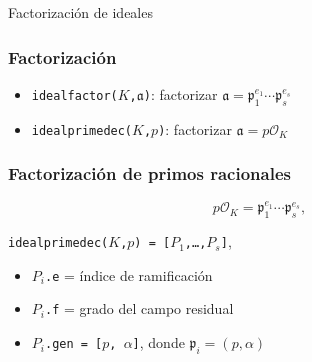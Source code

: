 \documentclass{beamer}
\renewcommand{\O}{\mathcal{O}}
\begin{document}

\begin{frame}[plain]
  \headingfont

  \begin{center}
    {\huge Factorización de ideales}
  \end{center}
\end{frame}


\begin{frame}[fragile]
  \frametitle{Factorización}

  \begin{itemize}
  \item \texttt{idealfactor($K$,$\mathfrak{a}$)}: factorizar $\mathfrak{a} = \mathfrak{p}_1^{e_1}\cdots\mathfrak{p}_s^{e_s}$

  \item \texttt{idealprimedec($K$,$p$)}: factorizar $\mathfrak{a} = p\O_K$
  \end{itemize}
\end{frame}


\begin{frame}[fragile]
  \frametitle{Factorización de primos racionales}

  $$p\O_K = \mathfrak{p}_1^{e_1} \cdots \mathfrak{p}_s^{e_s},$$

  \begin{center}
    \texttt{idealprimedec($K$,$p$) = [$P_1$,\ldots,$P_s$]},
  \end{center}

  \begin{itemize}
  \item \texttt{$P_i$.e} = índice de ramificación

  \item \texttt{$P_i$.f} = grado del campo residual

  \item \texttt{$P_i$.gen = [$p$, $\alpha$]}, donde $\mathfrak{p}_i = (p,\alpha)$
  \end{itemize}
\end{frame}

\end{document}

